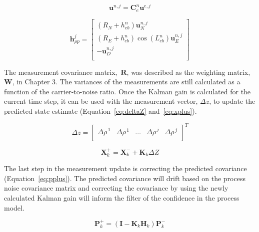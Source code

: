 \begin{equation}\label{eq:nav_u}
    \mathbf{u}^{n,j} = \mathbf{C}_e^n \mathbf{u}^{e,j}
\end{equation}

\begin{equation}\label{eq:nav_h}
    \mathbf{h}^j_{\rho p} =
    \begin{bmatrix}
        \left(R_N + h^n_{eb}\right)\mathbf{u}^{n,j}_N               \\
        \left(R_E + h_{eb}^n\right)\cos(L^n_{eb})\mathbf{u}^{n,j}_E \\
        -\mathbf{u}^{n,j}_D                                         \\
    \end{bmatrix}
\end{equation}

The measurement covariance matrix,~\(\mathbf{R}\), was described as the weighting matrix, \(\mathbf{W}\), in Chapter 3. The variances of the measurements are still calculated as a function of the carrier-to-noise ratio. Once the Kalman gain is calculated for the current time step, it can be used with the measurement vector, \(\Delta z\), to update the predicted state estimate (Equation~\ref{eq:deltaZ} and~\ref{eq:xplus}).

\begin{equation}\label{eq:deltaZ}
    \Delta z = \begin{bmatrix}
        \Delta\dot{\rho}^{\,1} & \Delta{\rho}^{\,1} & \hdots & \Delta\dot{\rho}^{\,j} & \Delta{\rho}^{\,j} \\
    \end{bmatrix}^T
\end{equation}

\begin{equation}\label{eq:xplus}
    \mathbf{X}_k^+ = \mathbf{X}^-_k + \mathbf{K}_k\Delta Z
\end{equation}

The last step in the measurement update is correcting the predicted covariance (Equation~\ref{eq:pplus}). The predicted covariance will drift based on the process noise covariance matrix and correcting the covariance by using the newly calculated Kalman gain will inform the filter of the confidence in the process model.

\begin{equation}\label{eq:pplus}
    \mathbf{P}^+_k = \left(\mathbf{I} - \mathbf{K}_k\mathbf{H}_k\right)\mathbf{P}^-_k
\end{equation}

